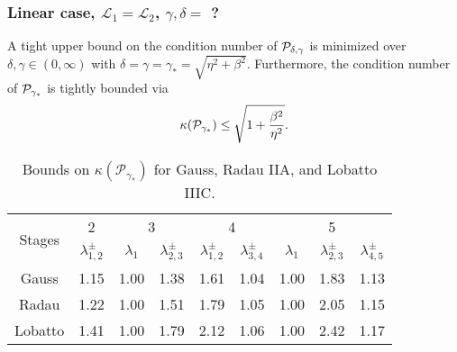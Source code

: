 \documentclass[blue]{beamer}
\begin{document}
%
\begin{frame}
\frametitle{Linear case, $\mathcal{L}_1=\mathcal{L}_2$, $\gamma ,\delta = $ ?}

\begin{corollary}[Optimal preconditioning with $\gamma = \delta$]
A tight upper bound on the condition number of ${\cal P}_{\delta,\gamma}$
is minimized over $\delta, \gamma \in (0, \infty)$ with $\delta = \gamma = 
\gamma_* = \sqrt{\eta^2 + \beta^2}.$
Furthermore, the condition number of ${\cal P}_{\gamma_*}$
is tightly bounded via
\begin{align*}
\kappa({\cal P}_{\gamma_*}) \leq \sqrt{1 + \frac{\beta^2}{\eta^2}}.
\end{align*}
\end{corollary}

{
\renewcommand{\tabcolsep}{3pt}
\renewcommand{\arraystretch}{1.15}
\begin{table}[!ht]
  \centering
  \begin{tabular}{| c | c | cc | cc | ccc |}  %
  \hline
\multirow{2}{*}{Stages} & 2 & \multicolumn{2}{c}{3} & \multicolumn{2}{|c}{4} & \multicolumn{3}{|c|}{5} \\

& {$\lambda_{1,2}^\pm$} & {$\lambda_1$} & {$\lambda_{2,3}^\pm$} & {$\lambda_{1,2}^\pm$} &
    {$\lambda_{3,4}^\pm$} & {$\lambda_1$} & {$\lambda_{2,3}^\pm$} & {$\lambda_{4,5}^\pm$} \\
\hline
Gauss & 1.15 & 1.00 & 1.38 & 1.61 & 1.04 & 1.00 & 1.83 & 1.13 \\
Radau & 1.22 & 1.00 & 1.51 & 1.79 & 1.05 & 1.00 & 2.05 & 1.15 \\
Lobatto & 1.41 & 1.00 & 1.79 & 2.12 & 1.06 & 1.00 & 2.42 & 1.17 \\\hline
  \end{tabular}
  \caption{Bounds on $\kappa(\mathcal{P}_{\gamma_*})$ for Gauss, Radau IIA,
  and Lobatto IIIC.}
\end{table}
}

\end{frame}
\end{document}
